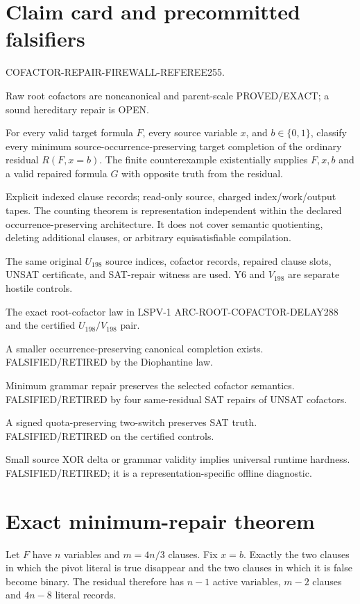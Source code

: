 \documentclass[11pt]{article}
\newcommand{\status}[1]{\textsf{#1}}
\begin{document}
\section{Claim card and precommitted falsifiers}
\begin{description}[leftmargin=2.8cm]
\item[Claim ID.] COFACTOR-REPAIR-FIREWALL-REFEREE255.
\item[Prior status.] Raw root cofactors are noncanonical and parent-scale
\status{PROVED/EXACT}; a sound hereditary repair is \status{OPEN}.
\item[Quantifiers.] For every valid target formula $F$, every source variable
$x$, and $b\in\{0,1\}$, classify every minimum source-occurrence-preserving
target completion of the ordinary residual $R(F,x=b)$.  The finite
counterexample existentially supplies $F,x,b$ and a valid repaired formula
$G$ with opposite truth from the residual.
\item[Model.] Explicit indexed clause records; read-only source, charged
index/work/output tapes.  The counting theorem is representation independent
within the declared occurrence-preserving architecture.  It does not cover
semantic quotienting, deleting additional clauses, or arbitrary
equisatisfiable compilation.
\item[SAME\_REALIZATION.] The same original $U_{198}$ source indices,
cofactor records, repaired clause slots, UNSAT certificate, and SAT-repair
witness are used.  Y6 and $V_{198}$ are separate hostile controls.
\item[Minimum sufficient predecessor.] The exact root-cofactor law in
LSPV-1 ARC-ROOT-COFACTOR-DELAY288 and the certified $U_{198}/V_{198}$ pair.
\item[F1.] A smaller occurrence-preserving canonical completion exists.
\status{FALSIFIED/RETIRED} by the Diophantine law.
\item[F2.] Minimum grammar repair preserves the selected cofactor semantics.
\status{FALSIFIED/RETIRED} by four same-residual SAT repairs of UNSAT
cofactors.
\item[F3.] A signed quota-preserving two-switch preserves SAT truth.
\status{FALSIFIED/RETIRED} on the certified controls.
\item[F4.] Small source XOR delta or grammar validity implies universal
runtime hardness.  \status{FALSIFIED/RETIRED}; it is a representation-specific
offline diagnostic.
\end{description}

\section{Exact minimum-repair theorem}
Let $F$ have $n$ variables and $m=4n/3$ clauses.  Fix $x=b$.  Exactly the two
clauses in which the pivot literal is true disappear and the two clauses in
which it is false become binary.  The residual therefore has $n-1$ active
variables, $m-2$ clauses and $4n-8$ literal records.
\end{document}
